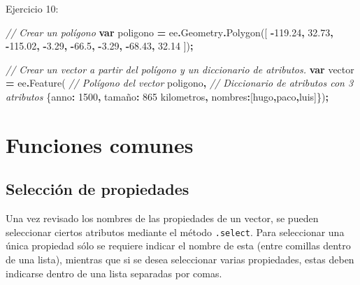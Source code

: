 \documentclass[
  12pt,
  letterpaper,
  twoside]{book}
\newenvironment{Shaded}{\begin{snugshade}}{\end{snugshade}}
\newcommand{\AttributeTok}[1]{\textcolor[rgb]{0.77,0.63,0.00}{#1}}
\newcommand{\CommentTok}[1]{\textcolor[rgb]{0.56,0.35,0.01}{\textit{#1}}}
\newcommand{\DataTypeTok}[1]{\textcolor[rgb]{0.13,0.29,0.53}{#1}}
\newcommand{\DecValTok}[1]{\textcolor[rgb]{0.00,0.00,0.81}{#1}}
\newcommand{\FloatTok}[1]{\textcolor[rgb]{0.00,0.00,0.81}{#1}}
\newcommand{\FunctionTok}[1]{\textcolor[rgb]{0.00,0.00,0.00}{#1}}
\newcommand{\KeywordTok}[1]{\textcolor[rgb]{0.13,0.29,0.53}{\textbf{#1}}}
\newcommand{\NormalTok}[1]{#1}
\newcommand{\OperatorTok}[1]{\textcolor[rgb]{0.81,0.36,0.00}{\textbf{#1}}}
\newcommand{\StringTok}[1]{\textcolor[rgb]{0.31,0.60,0.02}{#1}}
\begin{document}
Ejercicio 10:

\begin{Shaded}
\begin{Highlighting}[]
\CommentTok{// Crear un polígono}
\KeywordTok{var}\NormalTok{ poligono }\OperatorTok{=}\NormalTok{ ee}\OperatorTok{.}\AttributeTok{Geometry}\OperatorTok{.}\FunctionTok{Polygon}\NormalTok{([}
  \OperatorTok{{-}}\FloatTok{119.24}\OperatorTok{,} \FloatTok{32.73}\OperatorTok{,}
  \OperatorTok{{-}}\FloatTok{115.02}\OperatorTok{,} \OperatorTok{{-}}\FloatTok{3.29}\OperatorTok{,}
  \OperatorTok{{-}}\FloatTok{66.5}\OperatorTok{,} \OperatorTok{{-}}\FloatTok{3.29}\OperatorTok{,}
  \OperatorTok{{-}}\FloatTok{68.43}\OperatorTok{,} \FloatTok{32.14}
\NormalTok{])}\OperatorTok{;}

\CommentTok{// Crear un vector a partir del polígono y un diccionario de atributos.}
\KeywordTok{var}\NormalTok{ vector }\OperatorTok{=}\NormalTok{ ee}\OperatorTok{.}\FunctionTok{Feature}\NormalTok{(}
  \CommentTok{// Polígono del vector}
\NormalTok{  poligono}\OperatorTok{,}                      
  \CommentTok{// Diccionario de atributos con 3 atributos}
\NormalTok{  \{}\DataTypeTok{anno}\OperatorTok{:} \DecValTok{1500}\OperatorTok{,}                    
  \DataTypeTok{tamaño}\OperatorTok{:} \StringTok{\textquotesingle{}865 kilometros\textquotesingle{}}\OperatorTok{,}
  \DataTypeTok{nombres}\OperatorTok{:}\NormalTok{[}\StringTok{\textquotesingle{}hugo\textquotesingle{}}\OperatorTok{,}\StringTok{\textquotesingle{}paco\textquotesingle{}}\OperatorTok{,}\StringTok{\textquotesingle{}luis\textquotesingle{}}\NormalTok{]\})}\OperatorTok{;}
\end{Highlighting}
\end{Shaded}

\hypertarget{funciones-comunes-1}{%
\section{Funciones comunes}\label{funciones-comunes-1}}

\hypertarget{selecciuxf3n-de-propiedades}{%
\subsection{Selección de propiedades}\label{selecciuxf3n-de-propiedades}}

Una vez revisado los nombres de las propiedades de un vector, se pueden seleccionar ciertos atributos mediante el método \texttt{.select}. Para seleccionar una única propiedad sólo se requiere indicar el nombre de esta (entre comillas dentro de una lista), mientras que si se desea seleccionar varias propiedades, estas deben indicarse dentro de una lista separadas por comas.
\end{document}
